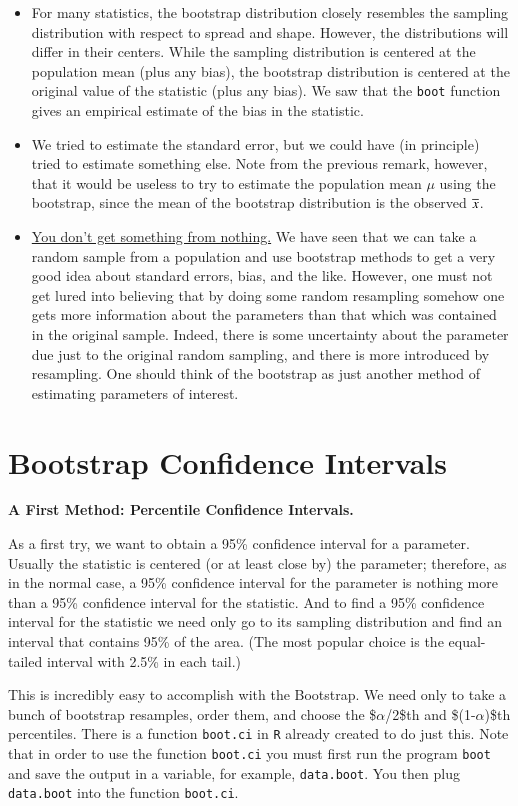 \documentclass[captions=tableheading]{scrbook}
\begin{document}
\begin{itemize}
\item For many statistics, the bootstrap distribution closely resembles the sampling distribution with respect to spread and shape. However, the distributions will differ in their centers. While the sampling distribution is centered at the population mean (plus any bias), the bootstrap distribution is centered at the original value of the statistic (plus any bias). We saw that the \texttt{boot} function gives an empirical estimate of the bias in the statistic.
\item We tried to estimate the standard error, but we could have (in principle) tried to estimate something else. Note from the previous remark, however, that it would be useless to try to estimate the population mean $\mu$ using the bootstrap, since the mean of the bootstrap distribution is the observed $\overline{x}$.
\item \underline{You don't get something from nothing.} We have seen that we can take a random sample from a population and use bootstrap methods to get a very good idea about standard errors, bias, and the like. However, one must not get lured into believing that by doing some random resampling somehow one gets more information about the parameters than that which was contained in the original sample. Indeed, there is some uncertainty about the parameter due just to the original random sampling, and there is more introduced by resampling. One should think of the bootstrap as just another method of estimating parameters of interest.
\end{itemize}
\section{Bootstrap Confidence Intervals}
\label{sec-4_3}


\textbf{A First Method: Percentile Confidence Intervals.}

As a first try, we want to obtain a 95\% confidence interval for a parameter. Usually the statistic is centered (or at least close by) the parameter; therefore, as in the normal case, a 95\% confidence interval for the parameter is nothing more than a 95\% confidence interval for the statistic. And to find a 95\% confidence interval for the statistic we need only go to its sampling distribution and find an interval that contains 95\% of the area. (The most popular choice is the equal-tailed interval with 2.5\% in each tail.)

This is incredibly easy to accomplish with the Bootstrap. We need only to take a bunch of bootstrap resamples, order them, and choose the \$$\alpha$/2\$th and \$(1-$\alpha$)\$th percentiles. There is a function \texttt{boot.ci} in \texttt{R} already created to do just this. Note that in order to use the function \texttt{boot.ci} you must first run the program \texttt{boot} and save the output in a variable, for example, \texttt{data.boot}.  You then plug \texttt{data.boot} into the function \texttt{boot.ci}.
\end{document}

